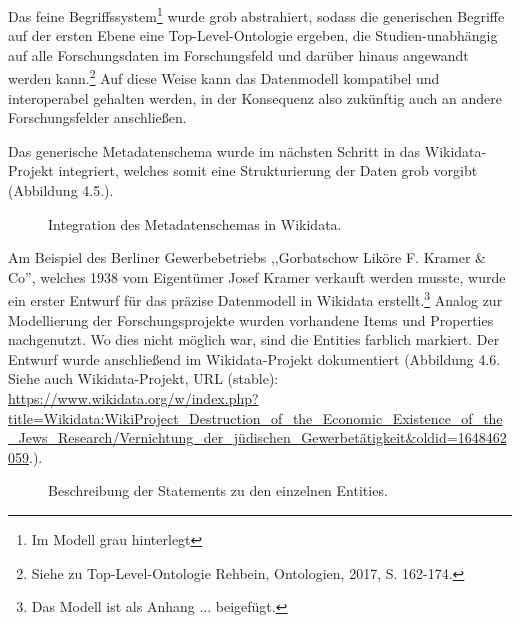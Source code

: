 Das feine Begriffssystem\footnote{Im Modell grau hinterlegt} wurde grob abstrahiert, sodass die generischen Begriffe auf der ersten Ebene eine Top-Level-Ontologie ergeben, die Studien-unabhängig auf alle Forschungsdaten im Forschungsfeld und darüber hinaus angewandt werden kann.\footnote{Siehe zu Top-Level-Ontologie Rehbein, Ontologien, 2017, S. 162-174.} Auf diese Weise kann das Datenmodell kompatibel und interoperabel gehalten werden, in der Konsequenz also zukünftig auch an andere Forschungsfelder anschließen.

Das generische Metadatenschema wurde im nächsten Schritt in das Wikidata-Projekt integriert, welches somit eine Strukturierung der Daten grob vorgibt (Abbildung 4.5.). 

\begin{figure}[h]
    \centering
    \caption{Integration des Metadatenschemas in Wikidata.}
    \label{fig:x cubed graph}
\end{figure}

Am Beispiel des Berliner Gewerbebetriebs ,,Gorbatschow Liköre F. Kramer \& Co'', welches 1938 vom Eigentümer Josef Kramer verkauft werden musste, wurde ein erster Entwurf für das präzise Datenmodell in Wikidata erstellt.\footnote{Das Modell ist als Anhang ... beigefügt.} Analog zur Modellierung der Forschungsprojekte wurden vorhandene Items und Properties nachgenutzt. Wo dies nicht möglich war, sind die Entities farblich markiert. Der Entwurf wurde anschließend im Wikidata-Projekt dokumentiert (Abbildung 4.6. Siehe auch Wikidata-Projekt, URL (stable): \url{https://www.wikidata.org/w/index.php?title=Wikidata:WikiProject\_Destruction\_of\_the\_Economic\_Existence\_of\_the\_Jews\_Research/Vernichtung\_der\_jüdischen\_Gewerbetätigkeit&oldid=1648462059}.).   

\begin{figure}[h]
    \centering
    \caption{Beschreibung der Statements zu den einzelnen Entities.}
    \label{fig:x cubed graph}
\end{figure}

